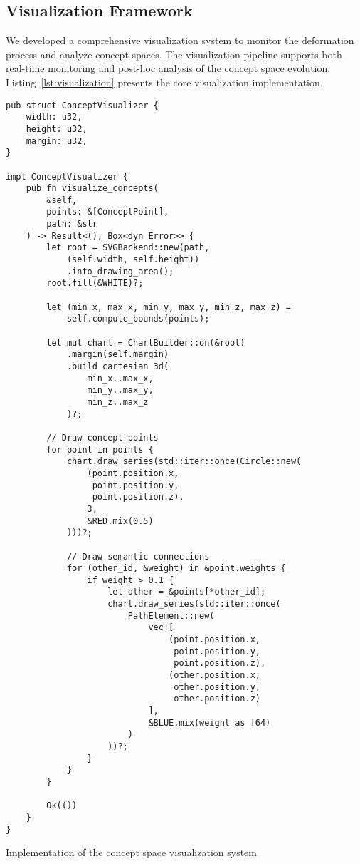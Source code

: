 \documentclass{article}
\begin{document}
\subsection{Visualization Framework}
We developed a comprehensive visualization system to monitor the deformation process and analyze concept spaces. The visualization pipeline supports both real-time monitoring and post-hoc analysis of the concept space evolution. Listing~\ref{lst:visualization} presents the core visualization implementation.

\begin{listing}[h]
\begin{verbatim}
pub struct ConceptVisualizer {
    width: u32,
    height: u32,
    margin: u32,
}

impl ConceptVisualizer {
    pub fn visualize_concepts(
        &self,
        points: &[ConceptPoint],
        path: &str
    ) -> Result<(), Box<dyn Error>> {
        let root = SVGBackend::new(path, 
            (self.width, self.height))
            .into_drawing_area();
        root.fill(&WHITE)?;
        
        let (min_x, max_x, min_y, max_y, min_z, max_z) = 
            self.compute_bounds(points);
            
        let mut chart = ChartBuilder::on(&root)
            .margin(self.margin)
            .build_cartesian_3d(
                min_x..max_x,
                min_y..max_y,
                min_z..max_z
            )?;
            
        // Draw concept points
        for point in points {
            chart.draw_series(std::iter::once(Circle::new(
                (point.position.x, 
                 point.position.y, 
                 point.position.z),
                3,
                &RED.mix(0.5)
            )))?;
            
            // Draw semantic connections
            for (other_id, &weight) in &point.weights {
                if weight > 0.1 {
                    let other = &points[*other_id];
                    chart.draw_series(std::iter::once(
                        PathElement::new(
                            vec![
                                (point.position.x, 
                                 point.position.y, 
                                 point.position.z),
                                (other.position.x, 
                                 other.position.y, 
                                 other.position.z)
                            ],
                            &BLUE.mix(weight as f64)
                        )
                    ))?;
                }
            }
        }
        
        Ok(())
    }
}
\end{verbatim}
\caption{Implementation of the concept space visualization system}
\label{lst:visualization}
\end{listing}
\end{document}
